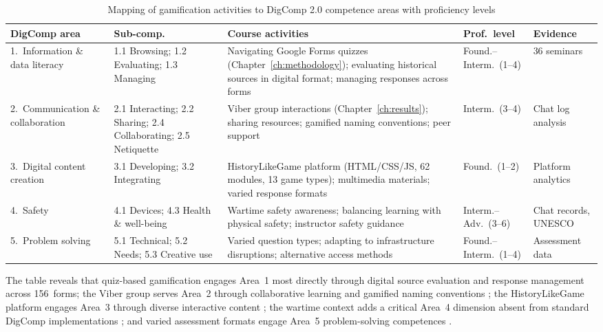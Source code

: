 \begin{table}[!h]
\centering
\caption{Mapping of gamification activities to DigComp 2.0 competence areas with proficiency levels}
\label{tab:digcomp-mapping}
\small
\begin{tabular}{@{}p{2.2cm}p{2.5cm}p{4.2cm}p{1.5cm}p{2cm}@{}}
\toprule
\textbf{DigComp area} & \textbf{Sub-comp.} & \textbf{Course activities} & \textbf{Prof.\ level} & \textbf{Evidence} \\
\midrule
1.\ Information \& data literacy & 1.1 Browsing; 1.2 Evaluating; 1.3 Managing & Navigating Google Forms quizzes (Chapter~\ref{ch:methodology}); evaluating historical sources in digital format; managing responses across forms & Found.--Interm.\ (1--4) & 36 seminars \\
\midrule
2.\ Communication \& collaboration & 2.1 Interacting; 2.2 Sharing; 2.4 Collaborating; 2.5 Netiquette & Viber group interactions (Chapter~\ref{ch:results}); sharing resources; gamified naming conventions; peer support & Interm.\ (3--4) & Chat log analysis \\
\midrule
3.\ Digital content creation & 3.1 Developing; 3.2 Integrating & HistoryLikeGame platform (HTML/CSS/JS, 62 modules, 13 game types); multimedia materials; varied response formats & Found.\ (1--2) & Platform analytics \\
\midrule
4.\ Safety & 4.1 Devices; 4.3 Health \& well-being & Wartime safety awareness; balancing learning with physical safety; instructor safety guidance & Interm.--Adv.\ (3--6) & Chat records, UNESCO \\
\midrule
5.\ Problem solving & 5.1 Technical; 5.2 Needs; 5.3 Creative use & Varied question types; adapting to infrastructure disruptions; alternative access methods & Found.--Interm.\ (1--4) & Assessment data \\
\bottomrule
\end{tabular}
\end{table}

The table reveals that quiz-based gamification engages Area~1 most directly through digital source evaluation and response management across 156~forms; the Viber group serves Area~2 through collaborative learning and gamified naming conventions \citep{Vuorikari2016, Korniienko2025cte, Guitert2023245}; the HistoryLikeGame platform engages Area~3 through diverse interactive content \citep{Korniienko2025cte}; the wartime context adds a critical Area~4 dimension absent from standard DigComp implementations \citep{UNESCO2023, Ovcharuk2023}; and varied assessment formats engage Area~5 problem-solving competences \citep{Osuna-Acedo202189}.

